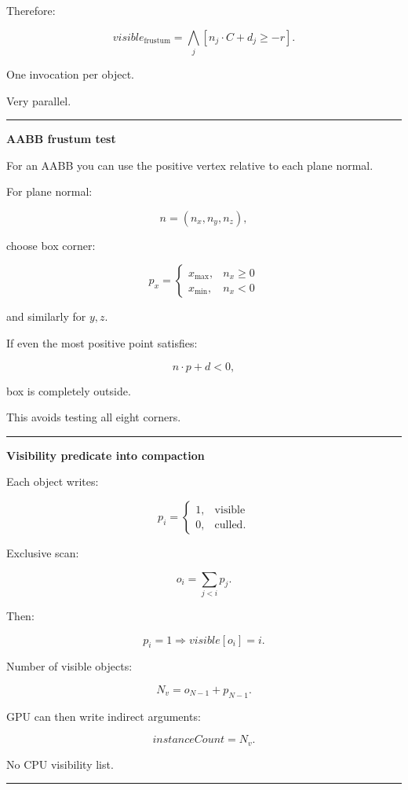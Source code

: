 Therefore:

\[
\boxed{
visible_{\text{frustum}}
=
\bigwedge_j
[
n_j\cdot C+d_j\ge-r
].
}
\]

One invocation per object.

Very parallel.

\begin{center}\rule{0.5\linewidth}{0.5pt}\end{center}

\textbf{AABB frustum test}

For an AABB you can use the positive vertex relative to each plane normal.

For plane normal:

\[
n=(n_x,n_y,n_z),
\]

choose box corner:

\[
p_x=
\begin{cases}
x_{\max},&n_x\ge0\\
x_{\min},&n_x<0
\end{cases}
\]

and similarly for \(y,z\).

If even the most positive point satisfies:

\[
n\cdot p+d<0,
\]

box is completely outside.

This avoids testing all eight corners.

\begin{center}\rule{0.5\linewidth}{0.5pt}\end{center}

\textbf{Visibility predicate into compaction}

Each object writes:

\[
p_i=
\begin{cases}
1,&\text{visible}\\
0,&\text{culled}.
\end{cases}
\]

Exclusive scan:

\[
o_i=
\sum_{j<i}p_j.
\]

Then:

\[
p_i=1
\Rightarrow
visible[o_i]=i.
\]

Number of visible objects:

\[
N_v=
o_{N-1}+p_{N-1}.
\]

GPU can then write indirect arguments:

\[
instanceCount=N_v.
\]

No CPU visibility list.

\begin{center}\rule{0.5\linewidth}{0.5pt}\end{center}


